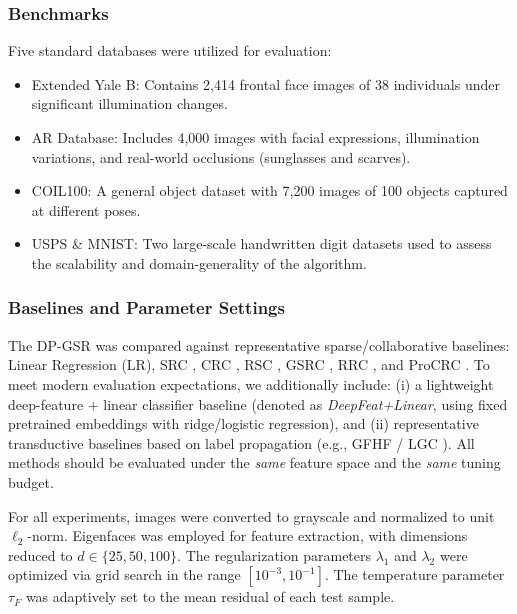 \documentclass[10pt,comsoc]{IEEEtran}
\begin{document}
\subsubsection{Benchmarks} 
Five standard databases were utilized for evaluation:
\begin{itemize}
    \item Extended Yale B\cite{georghiades2001from}: Contains 2,414 frontal face images of 38 individuals under significant illumination changes.
    \item AR Database\cite{martinez1998ar}: Includes 4,000 images with facial expressions, illumination variations, and real-world occlusions (sunglasses and scarves).
    \item COIL100\cite{nene1996coil}: A general object dataset with 7,200 images of 100 objects captured at different poses.
    \item USPS\cite{hull1994database} \& MNIST\cite{lecun1998gradient}: Two large-scale handwritten digit datasets used to assess the scalability and domain-generality of the algorithm.
\end{itemize}

\subsubsection{Baselines and Parameter Settings}
The DP-GSR was compared against representative sparse/collaborative baselines: Linear Regression (LR), SRC \cite{wright2009robust}, CRC \cite{zhang2011sparse}, RSC \cite{yang2011robust}, GSRC \cite{elhamifar2013robust}, RRC \cite{yang2017robust}, and ProCRC \cite{cai2016probabilistic}. To meet modern evaluation expectations, we additionally include: (i) a lightweight deep-feature + linear classifier baseline (denoted as \emph{DeepFeat+Linear}, using fixed pretrained embeddings with ridge/logistic regression), and (ii) representative transductive baselines based on label propagation (e.g., GFHF \cite{zhu2003semi} / LGC \cite{zhou2004learning}). All methods should be evaluated under the \emph{same} feature space and the \emph{same} tuning budget.

For all experiments, images were converted to grayscale and normalized to unit $\ell_2$-norm. Eigenfaces was employed for feature extraction, with dimensions reduced to $d \in \{25, 50, 100\}$. The regularization parameters $\lambda_1$ and $\lambda_2$ were optimized via grid search in the range $[10^{-3}, 10^{-1}]$. The temperature parameter $\tau_F$ was adaptively set to the mean residual of each test sample.
\end{document}
